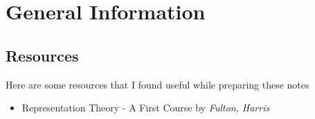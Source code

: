 \chapter{General Information}

\section{Resources}
\label{sec:Resources}
Here are some resources that I found useful while preparing these notes
\begin{itemize}
    \item Representation Theory - A First Course by \emph{Fulton, Harris}
\end{itemize}


\nocite{*} %
\printbibliography


